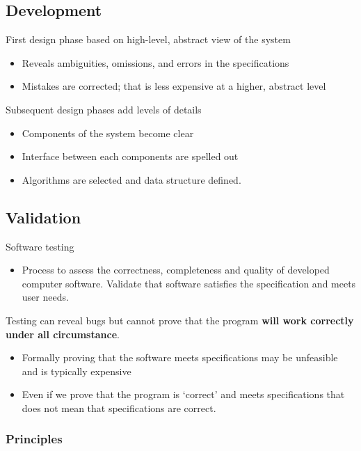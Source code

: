 \documentclass{article}
\begin{document}
\subsection{Development}

\begin{flushleft}
First design phase based on high-level, abstract view of the system
\begin{itemize}
  \item Reveals ambiguities, omissions, and errors in the specifications
  \item Mistakes are corrected; that is less expensive at a higher, abstract level
\end{itemize}
Subsequent design phases add levels of details
\begin{itemize}
  \item Components of the system become clear
  \item Interface between each components are spelled out 
  \item Algorithms are selected and data structure defined.
\end{itemize}
\end{flushleft}

\subsection{Validation}

\begin{flushleft}
Software testing
\begin{itemize}
  \item Process to assess the correctness, completeness and quality of developed computer software. Validate that software satisfies the specification and meets user needs.
\end{itemize}
Testing can reveal bugs but cannot prove that the program \textbf{will work correctly under all circumstance}.
\begin{itemize}
  \item Formally proving that the software meets specifications may be unfeasible and is typically expensive 
  \item Even if we prove that the program is ‘correct’ and meets specifications that does not mean that specifications are correct.
\end{itemize}
\end{flushleft}

\subsubsection{Principles}
\end{document}
